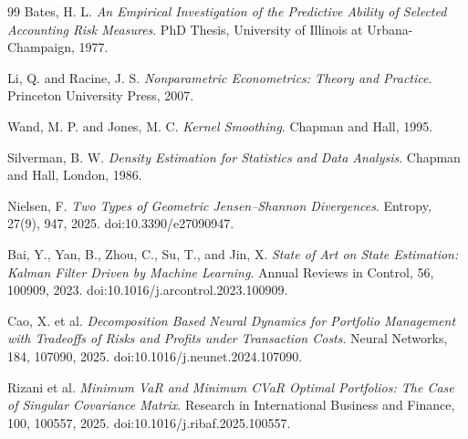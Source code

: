 \documentclass[preprint,12pt]{elsarticle}
\theoremstyle{plain}
\theoremstyle{definition}
\begin{document}
\begin{thebibliography}{99}
Bates, H. L.  
\textit{An Empirical Investigation of the Predictive Ability of Selected Accounting Risk Measures}.  
PhD Thesis, University of Illinois at Urbana-Champaign, 1977.

Li, Q. and Racine, J. S.  
\textit{Nonparametric Econometrics: Theory and Practice}.  
Princeton University Press, 2007.

Wand, M. P. and Jones, M. C.  
\textit{Kernel Smoothing}.  
Chapman and Hall, 1995.

Silverman, B. W.  
\textit{Density Estimation for Statistics and Data Analysis}.  
Chapman and Hall, London, 1986.

Nielsen, F.  
\textit{Two Types of Geometric Jensen--Shannon Divergences}.  
Entropy, 27(9), 947, 2025. doi:10.3390/e27090947.

Bai, Y., Yan, B., Zhou, C., Su, T., and Jin, X.  
\textit{State of Art on State Estimation: Kalman Filter Driven by Machine Learning}.  
Annual Reviews in Control, 56, 100909, 2023. doi:10.1016/j.arcontrol.2023.100909.

Cao, X. et al.  
\textit{Decomposition Based Neural Dynamics for Portfolio Management with Tradeoffs of Risks and Profits under Transaction Costs}.  
Neural Networks, 184, 107090, 2025. doi:10.1016/j.neunet.2024.107090.

Rizani et al.  
\textit{Minimum VaR and Minimum CVaR Optimal Portfolios: The Case of Singular Covariance Matrix}.  
Research in International Business and Finance, 100, 100557, 2025. doi:10.1016/j.ribaf.2025.100557.

\end{thebibliography}
\end{document}
